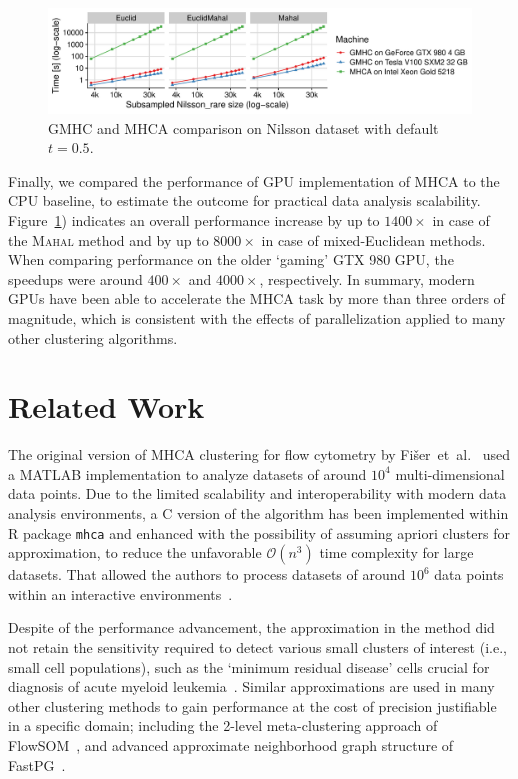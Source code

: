 \begin{figure}[t]
	\centering
	\includegraphics[width=12cm]{Mahalanobis/img/comparison.pdf}
	\caption{GMHC and MHCA comparison on Nilsson dataset with default $t=0.5$.}
	\label{fig:perf_comp}
\end{figure}

Finally, we compared the performance of GPU implementation of MHCA to the CPU baseline, to estimate the outcome for practical data analysis scalability.
Figure~\ref{fig:perf_comp}) indicates an overall performance increase by up to $1400\times$ in case of the \textsc{Mahal} method and by up to $8000\times$ in case of mixed-Euclidean methods.
When comparing performance on the older `gaming' GTX 980 GPU, the speedups were around $400\times$ and $4000\times$, respectively.
In summary, modern GPUs have been able to accelerate the MHCA task by more than three orders of magnitude, which is consistent with the effects of parallelization applied to many other clustering algorithms.


\section{Related Work}\label{sec:relwork}

The original version of MHCA clustering for flow cytometry by Fišer~et~al.~\cite{fivser2012detection} used a MATLAB implementation to analyze datasets of around $10^4$ multi-dimensional data points.
Due to the limited scalability and interoperability with modern data analysis environments, a C version of the algorithm has been implemented within R package \texttt{mhca} and enhanced with the possibility of assuming apriori clusters for approximation, to reduce the unfavorable $\mathcal{O}(n^3)$ time complexity for large datasets.
That allowed the authors to process datasets of around $10^6$ data points within an interactive environments~\cite{kratochvil2020shinysom}.

Despite of the performance advancement, the approximation in the method did not retain the sensitivity required to detect various small clusters of interest (i.e., small cell populations), such as the `minimum residual disease' cells crucial for diagnosis of acute myeloid leukemia~\cite{fivser2012detection}.
Similar approximations are used in many other clustering methods to gain performance at the cost of precision justifiable in a specific domain; including the 2-level meta-clustering approach of FlowSOM~\cite{gassen2015flowsom}, and advanced approximate neighborhood graph structure of FastPG~\cite{fastpg}.

